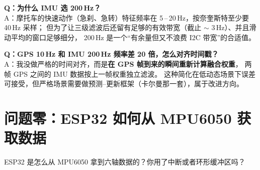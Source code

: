 \documentclass[UTF8,11pt,a4paper]{ctexart}
\begin{document}
\begin{followup}
\textbf{Q：为什么 IMU 选 200\,Hz？}\\
A：摩托车的快速动作（急刹、急转）特征频率在 5\,–\,20\,Hz，按奈奎斯特至少要 40\,Hz 采样；
但为了让三级滤波后还留有足够的有效带宽（截止 $\sim$ 3\,Hz）、并且滑动平均的窗口足够细分，
200\,Hz 是一个``有余量但又不浪费 I2C 带宽''的合适值。

\medskip
\textbf{Q：GPS 10\,Hz 和 IMU 200\,Hz 频率差 20 倍，怎么对齐时间戳？}\\
A：我没做严格的时间对齐，而是\textbf{在 GPS 帧到来的瞬间重新计算融合权重}，
两帧 GPS 之间的 IMU 数据按上一帧权重独立滤波。
这种简化在低动态场景下误差可接受，但严格场景需要做预测--更新框架（卡尔曼那一套），属于改进方向。
\end{followup}

\section{问题零：ESP32 如何从 MPU6050 获取数据}

\begin{interviewer}
ESP32 是怎么从 MPU6050 拿到六轴数据的？你用了中断或者环形缓冲区吗？
\end{interviewer}
\end{document}
